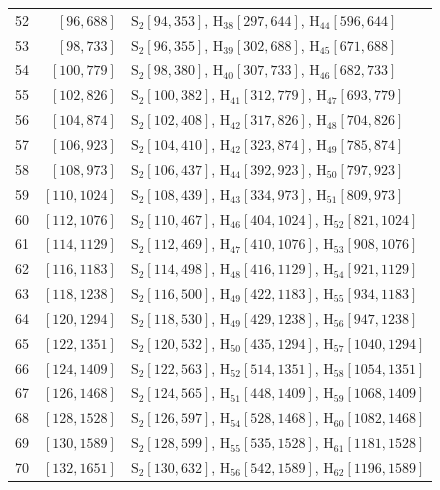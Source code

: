 \documentclass{amsart}
\theoremstyle{definition}
\theoremstyle{remark}
\numberwithin{equation}{section}
\begin{document}
{\begin{longtable}{rrp{}}
52&$[96,688]$&$\mathrm{S}_{2}[94,353]$, $\mathrm{H}_{38}[297,644]$, $\mathrm{H}_{44}[596,644]$\\
53&$[98,733]$&$\mathrm{S}_{2}[96,355]$, $\mathrm{H}_{39}[302,688]$, $\mathrm{H}_{45}[671,688]$\\
54&$[100,779]$&$\mathrm{S}_{2}[98,380]$, $\mathrm{H}_{40}[307,733]$, $\mathrm{H}_{46}[682,733]$\\
55&$[102,826]$&$\mathrm{S}_{2}[100,382]$, $\mathrm{H}_{41}[312,779]$, $\mathrm{H}_{47}[693,779]$\\
56&$[104,874]$&$\mathrm{S}_{2}[102,408]$, $\mathrm{H}_{42}[317,826]$, $\mathrm{H}_{48}[704,826]$\\
57&$[106,923]$&$\mathrm{S}_{2}[104,410]$, $\mathrm{H}_{42}[323,874]$, $\mathrm{H}_{49}[785,874]$\\
58&$[108,973]$&$\mathrm{S}_{2}[106,437]$, $\mathrm{H}_{44}[392,923]$, $\mathrm{H}_{50}[797,923]$\\
59&$[110,1024]$&$\mathrm{S}_{2}[108,439]$, $\mathrm{H}_{43}[334,973]$, $\mathrm{H}_{51}[809,973]$\\
60&$[112,1076]$&$\mathrm{S}_{2}[110,467]$, $\mathrm{H}_{46}[404,1024]$, $\mathrm{H}_{52}[821,1024]$\\
61&$[114,1129]$&$\mathrm{S}_{2}[112,469]$, $\mathrm{H}_{47}[410,1076]$, $\mathrm{H}_{53}[908,1076]$\\
62&$[116,1183]$&$\mathrm{S}_{2}[114,498]$, $\mathrm{H}_{48}[416,1129]$, $\mathrm{H}_{54}[921,1129]$\\
63&$[118,1238]$&$\mathrm{S}_{2}[116,500]$, $\mathrm{H}_{49}[422,1183]$, $\mathrm{H}_{55}[934,1183]$\\
64&$[120,1294]$&$\mathrm{S}_{2}[118,530]$, $\mathrm{H}_{49}[429,1238]$, $\mathrm{H}_{56}[947,1238]$\\
65&$[122,1351]$&$\mathrm{S}_{2}[120,532]$, $\mathrm{H}_{50}[435,1294]$, $\mathrm{H}_{57}[1040,1294]$\\
66&$[124,1409]$&$\mathrm{S}_{2}[122,563]$, $\mathrm{H}_{52}[514,1351]$, $\mathrm{H}_{58}[1054,1351]$\\
67&$[126,1468]$&$\mathrm{S}_{2}[124,565]$, $\mathrm{H}_{51}[448,1409]$, $\mathrm{H}_{59}[1068,1409]$\\
68&$[128,1528]$&$\mathrm{S}_{2}[126,597]$, $\mathrm{H}_{54}[528,1468]$, $\mathrm{H}_{60}[1082,1468]$\\
69&$[130,1589]$&$\mathrm{S}_{2}[128,599]$, $\mathrm{H}_{55}[535,1528]$, $\mathrm{H}_{61}[1181,1528]$\\
70&$[132,1651]$&$\mathrm{S}_{2}[130,632]$, $\mathrm{H}_{56}[542,1589]$, $\mathrm{H}_{62}[1196,1589]$\\

\end{longtable}}
\end{document}

